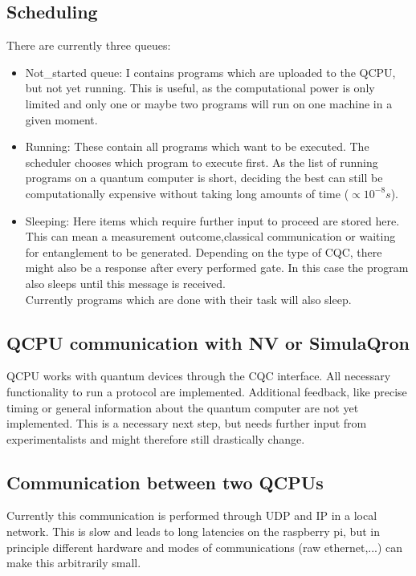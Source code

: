 \documentclass[]{article}
\begin{document}
\subsection{Scheduling}
There are currently three queues:
\begin{itemize}
	\item Not\_started queue: I contains programs which are uploaded to the QCPU, but not yet running. This is useful, as the computational power is only limited and only one or maybe two programs will run on one machine in a given moment.
	\item Running: These contain all programs which want to be executed. The scheduler chooses which program to execute first. As the list of running programs on a quantum computer is short, deciding the best can still be computationally expensive without taking long amounts of time ($\propto 10^{-8}s$).
	\item Sleeping: Here items which require further input to proceed are stored here. This can mean a measurement outcome,classical communication or waiting for entanglement to be generated. Depending on the type of CQC, there might also be a response after every performed gate. In this case the program also sleeps until this message is received. \\
	Currently programs which are done with their task will also sleep.
\end{itemize}	
\subsection{QCPU communication with NV or SimulaQron}
QCPU works with quantum devices through the CQC interface. All necessary functionality to run a protocol are implemented. Additional feedback, like precise timing or general information about the quantum computer are not yet implemented. This is a necessary next step, but needs further input from experimentalists and might therefore still drastically change.
\subsection{Communication between two QCPUs}
Currently this communication is performed through UDP and IP in a local network. This is slow and leads to long latencies on the raspberry pi, but in principle different hardware and modes of communications (raw ethernet,...) can make this arbitrarily small.
\end{document}

